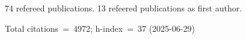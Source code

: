 74 refereed publications. 13 refeered publications as first author.

Total citations~=~4972; h-index~=~37 (2025-06-29)